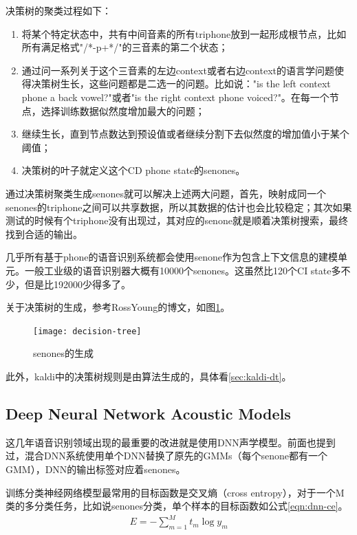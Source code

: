 决策树的聚类过程如下：
\begin{enumerate}
	\item 将某个特定状态中，共有中间音素的所有triphone放到一起形成根节点，比如所有满足格式"/*-p+*/"的三音素的第二个状态；
	\item 通过问一系列关于这个三音素的左边context或者右边context的语言学问题使得决策树生长，这些问题都是二选一的问题。比如说："is the left context phone a back vowel?"或者"is the right context phone voiced?"。在每一个节点，选择训练数据似然度增加最大的问题；
	\item 继续生长，直到节点数达到预设值或者继续分割下去似然度的增加值小于某个阈值；
	\item 决策树的叶子就定义这个CD phone state的senones。
\end{enumerate}

通过决策树聚类生成senones就可以解决上述两大问题，首先，映射成同一个senones的triphone之间可以共享数据，所以其数据的估计也会比较稳定；其次如果测试的时候有个triphone没有出现过，其对应的senone就是顺着决策树搜索，最终找到合适的输出。


几乎所有基于phone的语音识别系统都会使用senone作为包含上下文信息的建模单元。一般工业级的语音识别器大概有10000个senones。这虽然比120个CI state多不少，但是比192000少得多了。

关于决策树的生成，参考RossYoung的博文，如图\ref{fig:decision-tree}。
\begin{figure}[htbp]
	\centering
	\texttt{[image: decision-tree]}
	\caption{senones的生成\label{fig:decision-tree}}
\end{figure}

此外，kaldi中的决策树规则是由算法生成的，具体看\ref{sec:kaldi-dt}。

\subsection{Deep Neural Network Acoustic Models} 
\label{sub:dnn-am}
这几年语音识别领域出现的最重要的改进就是使用DNN声学模型。前面也提到过，混合DNN系统使用单个DNN替换了原先的GMMs（每个senone都有一个GMM），DNN的输出标签对应着senones。

训练分类神经网络模型最常用的目标函数是交叉熵（cross entropy），对于一个M类的多分类任务，比如说senones分类，单个样本的目标函数如公式\ref{eqn:dnn-ce}。
\begin{align}
\label{eqn:dnn-ce}
E = -\sum_{m=1}^{M} t_m\log{y_m}
\end{align}

